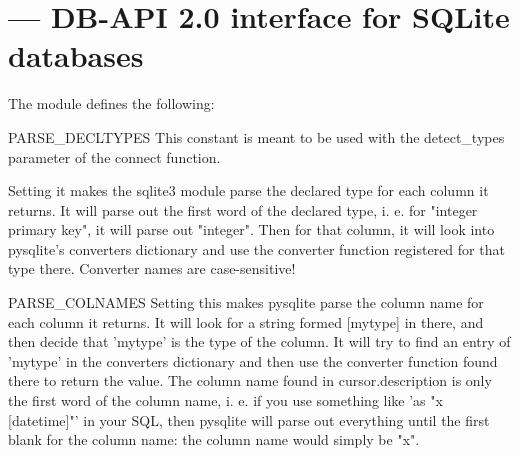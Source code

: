 \section{ ---
         DB-API 2.0 interface for SQLite databases}




The module defines the following:

\begin{datadesc}{PARSE_DECLTYPES}
This constant is meant to be used with the detect_types parameter of the connect function.

Setting it makes the sqlite3 module parse the declared type for each column it
returns.  It will parse out the first word of the declared type, i. e. for
"integer primary key", it will parse out "integer". Then for that column, it
will look into pysqlite's converters dictionary and use the converter function
registered for that type there.  Converter names are case-sensitive!
\end{datadesc}


\begin{datadesc}{PARSE_COLNAMES}
Setting this makes pysqlite parse the column name for each column it returns.
It will look for a string formed [mytype] in there, and then decide that
'mytype' is the type of the column. It will try to find an entry of 'mytype' in
the converters dictionary and then use the converter function found there to
return the value. The column name found in cursor.description is only the first
word of the column name, i.  e. if you use something like 'as "x [datetime]"'
in your SQL, then pysqlite will parse out everything until the first blank for
the column name: the column name would simply be "x".
\end{datadesc}

